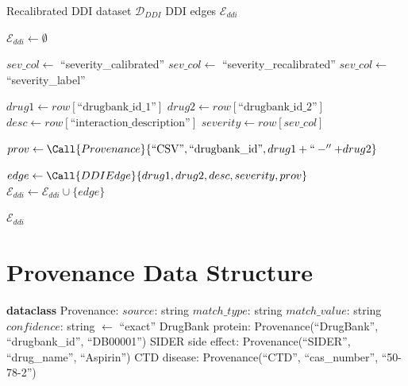 \documentclass[11pt,a4paper]{article}
\begin{document}
\begin{algorithm}[H]
\caption{ExtractDDIEdges: Drug-Drug Interactions with Recalibrated Severity}
\label{alg:ddi}
\begin{algorithmic}[1]
\REQUIRE Recalibrated DDI dataset $\mathcal{D}_{DDI}$
\ENSURE DDI edges $\mathcal{E}_{ddi}$

\STATE $\mathcal{E}_{ddi} \gets \emptyset$

\STATE {}
    \STATE $sev\_col \gets$ ``severity\_calibrated''
    \STATE $sev\_col \gets$ ``severity\_recalibrated''
\ELSE
    \STATE $sev\_col \gets$ ``severity\_label''
\ENDIF

    \STATE $drug1 \gets row[\text{``drugbank\_id\_1''}]$
    \STATE $drug2 \gets row[\text{``drugbank\_id\_2''}]$
    \STATE $desc \gets row[\text{``interaction\_description''}]$
    \STATE $severity \gets row[sev\_col]$
    
    \STATE $prov \gets \Call{Provenance}{\text{``CSV''}, \text{``drugbank\_id''}, drug1 + ``-'' + drug2}$
    
    \STATE $edge \gets \Call{DDIEdge}{drug1, drug2, desc, severity, prov}$
    \STATE $\mathcal{E}_{ddi} \gets \mathcal{E}_{ddi} \cup \{edge\}$
\ENDFOR

\RETURN $\mathcal{E}_{ddi}$
\end{algorithmic}
\end{algorithm}

\newpage
\section{Provenance Data Structure}

\begin{algorithm}[H]
\caption{Provenance: Data Lineage Tracking}
\label{alg:provenance}
\begin{algorithmic}[1]
\STATE {}
\STATE
\STATE \textbf{dataclass} Provenance:
\STATE \quad $source$: string 
\STATE \quad $match\_type$: string 
\STATE \quad $match\_value$: string 
\STATE \quad $confidence$: string $\gets$ ``exact'' 
\STATE
\STATE {}
\STATE \quad DrugBank protein: Provenance(``DrugBank'', ``drugbank\_id'', ``DB00001'')
\STATE \quad SIDER side effect: Provenance(``SIDER'', ``drug\_name'', ``Aspirin'')
\STATE \quad CTD disease: Provenance(``CTD'', ``cas\_number'', ``50-78-2'')
\end{algorithmic}
\end{algorithm}
\end{document}

